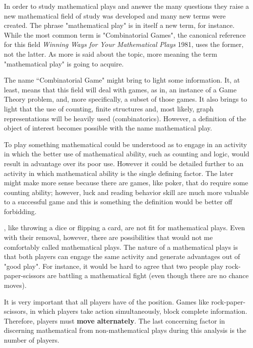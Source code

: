 
In order to study mathematical plays and answer the many questions they raise a new mathematical field of study was developed and many new terms were created. The phrase "mathematical play" is in itself a new term, for instance. While the most common term is "Combinatorial Games", the canonical reference for this field \textit{Winning Ways for Your Mathematical Plays} 1981, uses the former, not the latter. As more is said about the topic, more meaning the term "mathematical play" is going to acquire.

The name ``Combinatorial Game" might bring to light some information. It, at least, means that this field will deal with games, as in, an instance of a Game Theory problem, and, more specifically, a subset of those games. It also brings to light that the use of counting, finite structures and, most likely, graph representations will be heavily used (combinatorics). However, a definition of the object of interest becomes possible with the name mathematical play.

To play something mathematical could be understood as to engage in an activity in which the better use of mathematical ability, such as counting and logic, would result in advantage over its poor use. However it could be detailed further to an activity in which mathematical ability is the single defining factor. The later might make more sense because there are games, like poker, that do require some counting ability; however, luck and reading behavior skill are much more valuable to a successful game and this is something the definition would be better off forbidding.

, like throwing a dice or flipping a card, are not fit for mathematical plays. Even with their removal, however, there are possibilities that would not me comfortably called mathematical plays. The nature of a mathematical plays is that both players can engage the same activity and generate advantages out of "good play". For instance, it would be hard to agree that two people play rock-paper-scissors are battling a mathematical fight (even though there are no chance moves).

It is very important that all players have  of the position. Games like rock-paper-scissors, in which players take action simultaneously, block complete information. Therefore, players must \textbf{move alternately}. The last concerning factor in discerning mathematical from non-mathematical plays during this analysis is the number of players.

